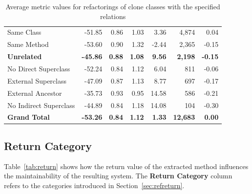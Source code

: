 \begin{table}[H]
{\begin{tabular}{@{}lrrrrrr@{}}
\hspace{10pt} Same Class & -51.85 & 0.86 & 1.03 & 3.36 & 4,874 & 0.04 \\
\hspace{10pt} Same Method & -53.60 & 0.90 & 1.32 & -2.44 & 2,365 & -0.15 \\ \midrule
\textbf{Unrelated} & \textbf{-45.86} & \textbf{0.88} & \textbf{1.08} & \textbf{9.56} & \textbf{2,198} & \textbf{-0.15} \\ \midrule
\hspace{10pt} No Direct Superclass & -52.24 & 0.84 & 1.12 & 6.04 & 811 & -0.06 \\
\hspace{10pt} External Superclass & -47.09 & 0.87 & 1.13 & 8.77 & 697 & -0.17 \\
\hspace{10pt} External Ancestor & -35.73 & 0.93 & 0.95 & 14.58 & 586 & -0.21 \\
\hspace{10pt} No Indirect Superclass & -44.89 & 0.84 & 1.18 & 14.08 & 104 & -0.30 \\ \midrule
\textbf{Grand Total} & \textbf{-53.26} & \textbf{0.84} & \textbf{1.12} & \textbf{1.33} & \textbf{12,683} & \textbf{0.00} \\ \bottomrule
\end{tabular}%
}
\caption{Average metric values for refactorings of clone classes with the specified relations}
\label{tab:full-relation}
\end{table}

\subsection{Return Category}
Table~\ref{tab:return} shows how the return value of the extracted method influences the maintainability of the resulting system. The \textbf{Return Category} column refers to the categories introduced in Section~\ref{sec:refreturn}.

\begin{table}[H]
\centering
{}
\caption{Average metric values for refactorings of clone classes with the specified return category}
\label{tab:full-return}
\end{table}

